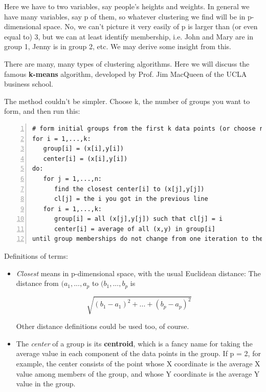 Here we have to two variables, say people's heights and weights.  In
general we have many variables, say p of them, so whatever clustering
we find will be in p-dimensional space.  No, we can't picture it very
easily of p is larger than (or even equal to) 3, but we can at least
identify membership, i.e. John and Mary are in group 1, Jenny is in
group 2, etc.  We may derive some insight from this.

There are many, many types of clustering algorithms.  Here we will
discuss the famous {\bf k-means} algorithm, developed by Prof. Jim
MacQueen of the UCLA business school.

The method couldn't be simpler.  Choose k, the number of groups you want
to form, and then run this:

\begin{Verbatim}[fontsize=\relsize{-2},numbers=left]
# form initial groups from the first k data points (or choose randomly)
for i = 1,...,k:
   group[i] = (x[i],y[i])
   center[i] = (x[i],y[i])
do:
   for j = 1,...,n:
      find the closest center[i] to (x[j],y[j])
      cl[j] = the i you got in the previous line
   for i = 1,...,k:
      group[i] = all (x[j],y[j]) such that cl[j] = i
      center[i] = average of all (x,y) in group[i]
until group memberships do not change from one iteration to the next
\end{Verbatim}

Definitions of terms:

\begin{itemize}

\item {\it Closest} means in p-dimensional space, with the usual
Euclidean distance:  The distance from $(a_1,...,a_p$ to $(b_1,...,b_p$
is

\begin{equation}
\sqrt{(b_1-a_1)^2+...+(b_p-a_p)^2}
\end{equation}

Other distance definitions could be used too, of course.

\item The {\it center} of a group is its {\bf centroid}, which is a
fancy name for taking the average value in each component of the data
points in the group.  If p = 2, for example, the center consists of the
point whose X coordinate is the average X value among members of the
group, and whose Y coordinate is the average Y value in the group.

\end{itemize}

